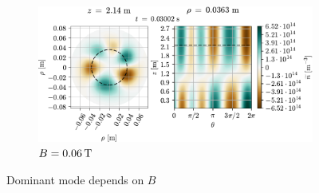 {\begin{figure}[htbp]
    \begin{subfigure}[h]{1.00\textwidth}
        \centering
        \includegraphics{fig/results/modesDiffScanVals/B006}
        \caption{$B=0.06 \, \text{T}$}
        \label{fig:B006}
    \end{subfigure}
    \caption{Dominant mode depends on $B$}
    \label{fig:dominatingMode}
\end{figure}
}
%


